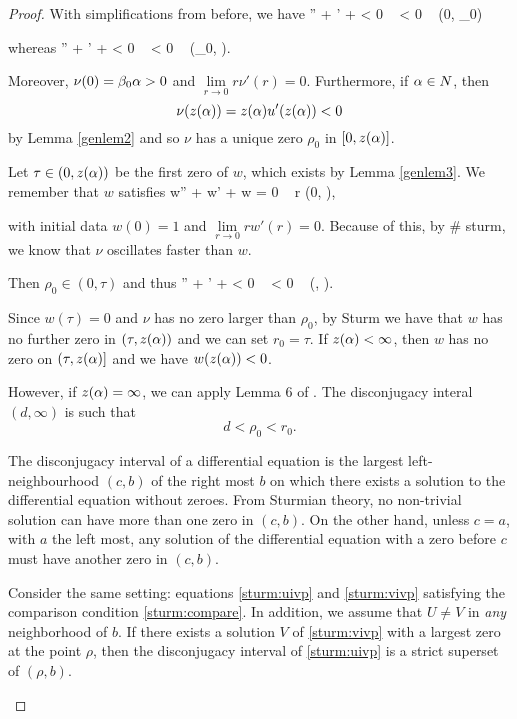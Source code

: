 \begin{proof}
With simplifications from before, we have
\be \label{nulivp}
\nu'' +  \nu' +  \nu < 0
\quad {} ~ \nu < 0 \quad {} ~ (0, \rho_0)
\ee

whereas
\be \label{nugivp}
\nu'' +  \nu' +  \nu < 0
\quad {} ~ \nu < 0 \quad {} ~ (\rho_0, \za).
\ee

Moreover, $\nu(0) = \beta_0 \alpha > 0$ and $\underset{r\to 0}{\lim} r\nu'(r) = 0$.
Furthermore, if $\alpha\in N$, then 
\[ \nu(z(\alpha)) = z(\alpha) u'(z(\alpha)) < 0 \]
by Lemma \ref{genlem2} and so $\nu$ has a unique zero $\rho_0$ in $[0,z(\alpha)]$.

Let $\tau \in (0,z(\alpha))$ be the first zero of $w$, which exists by Lemma
\ref{genlem3}. We remember that $w$ satisfies
\be \label{wivp}
w'' +  w' +  w = 0
\quad {} ~ r \in (0, \za),
\ee

with initial data $w(0) = 1$ and $\underset{r\to 0}{\lim} rw'(r) = 0$. Because
of this, by \# sturm, we know that $\nu$ oscillates faster than $w$.

Then $\rho_0 \in (0,\tau)$ and thus
\be \label{nutivp}
\nu'' +  \nu' +  \nu < 0
\quad {} ~ \nu < 0 \quad {} ~ (\tau, \za).
\ee

Since $w(\tau)=0$ and $\nu$ has no zero larger than $\rho_0$, by Sturm we have
that $w$ has no further zero in $(\tau, z(\alpha))$ and we can set $r_0 = \tau$. If
$z(\alpha) < \infty$, then $w$ has no zero on $(\tau, z(\alpha)]$ and we have $w(z(\alpha)) < 0$.

However, if $z(\alpha) = \infty$, we can apply Lemma 6 of \cite[p.~249]{kwong}. The
disconjugacy interal $(d, \infty)$ is such that 
\[ d < \rho_0 < r_0. \]

\begin{emph}
    The disconjugacy interval of a differential equation is the largest
    left-neighbourhood $(c, b)$ of the {\red right most} $b$ on which there
    exists a solution to the differential equation without zeroes. From Sturmian
    theory, no non-trivial solution can have more than one zero in $(c, b)$. On
    the other hand, unless $c = a$, with $a$ the {\red left most}, any solution
    of the differential equation with a zero before $c$ must have another zero
    in $(c, b)$. 

    Consider the same setting: equations \eqref{sturm:uivp} and
    \eqref{sturm:vivp} satisfying the comparison condition
    \eqref{sturm:compare}. In addition, we assume that $U \neq V$ in \emph{any}
    neighborhood of $b$. If there exists a solution $V$ of \eqref{sturm:vivp}
    with a largest zero at the point $\rho$, then the disconjugacy interval of
    \eqref{sturm:uivp} is a strict superset of $(\rho, b)$. 


\end{emph}
\end{proof}
